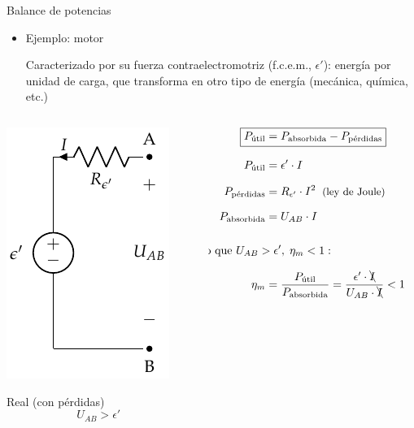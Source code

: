 \documentclass[aspectratio=169, xcolor={usenames,svgnames,dvipsnames}]{beamer}
\begin{document}
\begin{frame}{Balance de potencias}
    \begin{itemize}
        \item Ejemplo: \alert{motor}

        \vspace{1mm}
        Caracterizado por su \alert{fuerza contraelectromotriz} (f.c.e.m., $\epsilon'$): energía por unidad de carga, que transforma en otro tipo de energía (mecánica, química, etc.)
    \end{itemize}
    \begin{columns}
    \begin{column}{0.3\columnwidth}
        \begin{center}
        \includegraphics[height=0.5\textheight]{../figs/receptor_real.pdf}
        
        \alert{Real} (con pérdidas)
        \begin{equation*}
            U_{AB}>\epsilon'
        \end{equation*}
        \end{center}
    \end{column}
    \begin{column}{0.4\columnwidth}
    \vspace{-4mm}
    \begin{align*}
        \Aboxed{ P_{\textrm{útil}} &= P_{\textrm{absorbida}} - P_{\textrm{pérdidas}} }\\[7pt]
        P_{\textrm{útil}} &= \epsilon'\cdot I\\[7pt]
        P_{\textrm{pérdidas}} &= R_{\epsilon'}\cdot I^2 \;\; \text{\small{(ley de Joule)}}\\[7pt]
        P_{\textrm{absorbida}} &= U_{AB}\cdot I\\[15pt]
        & \hspace{-25mm}\text{Dado que } U_{AB}>\epsilon', \;\eta_m < 1:\\[7pt]
        \eta_m &= \frac{P_{\textrm{útil}}}{P_{\textrm{absorbida}}} = \frac{\epsilon' \cdot \bcancel{I}}{U_{AB} \cdot \bcancel{I}} < 1
    \end{align*}
    \end{column}
    \end{columns}
\end{frame}
\end{document}
